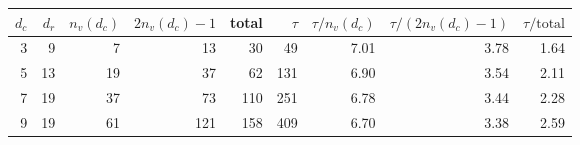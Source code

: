 \begin{tabular}{rrrrrrrrr}
\toprule
$d_c$ & $d_r$ & $n_v(d_c)$ & $2n_v(d_c)-1$ & total & $\tau$ & $\tau/n_v(d_c)$ & $\tau/(2n_v(d_c)-1)$ & $\tau/\mathrm{total}$ \\
\midrule
3 & 9 & 7 & 13 & 30 & 49 & 7.01 & 3.78 & 1.64 \\
5 & 13 & 19 & 37 & 62 & 131 & 6.90 & 3.54 & 2.11 \\
7 & 19 & 37 & 73 & 110 & 251 & 6.78 & 3.44 & 2.28 \\
9 & 19 & 61 & 121 & 158 & 409 & 6.70 & 3.38 & 2.59 \\
\bottomrule
\end{tabular}
